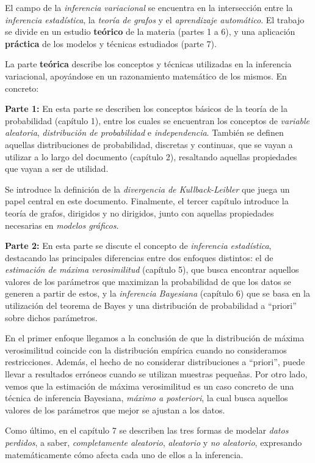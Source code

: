 
El campo de la \emph{inferencia variacional} se encuentra en la intersección entre la \emph{inferencia estadística}, la \emph{teoría de grafos} y el \emph{aprendizaje automático}. El trabajo se divide en un estudio \textbf{teórico} de la materia (partes 1 a 6), y una aplicación \textbf{práctica} de los modelos y técnicas estudiados (parte 7).

La parte \textbf{teórica} describe los conceptos y técnicas utilizadas en la inferencia variacional, apoyándose en un razonamiento matemático de los mismos. En concreto:

\textbf{Parte 1:} En esta parte se describen los conceptos básicos de la teoría de la probabilidad (capítulo 1), entre los cuales se encuentran los conceptos de \emph{variable aleatoria}, \emph{distribución de probabilidad} e \emph{independencia}. También se definen aquellas distribuciones de probabilidad, discretas y continuas, que se vayan a utilizar a lo largo del documento (capítulo 2), resaltando aquellas propiedades que vayan a ser de utilidad.

Se introduce la definición de la \emph{divergencia de Kullback-Leibler} que juega un papel central en este documento. Finalmente, el tercer capítulo introduce la teoría de grafos, dirigidos y no dirigidos, junto con aquellas propiedades necesarias en \emph{modelos gráficos}.

\textbf{Parte 2:} En esta parte se discute el concepto de \emph{inferencia estadística}, destacando las principales diferencias entre dos enfoques distintos: el de \emph{estimación de máxima verosimilitud} (capítulo 5), que busca encontrar aquellos valores de los parámetros que maximizan la probabilidad de que los datos se generen a partir de estos, y la \emph{inferencia Bayesiana} (capítulo 6) que se basa en la utilización del teorema de Bayes y una distribución de probabilidad a ``priori'' sobre dichos parámetros.

En el primer enfoque llegamos a la conclusión de que la distribución de máxima verosimilitud coincide con la distribución empírica cuando no consideramos restricciones. Además, el hecho de no considerar distribuciones a ``priori'', puede llevar a resultados erróneos cuando se utilizan muestras pequeñas. Por otro lado, vemos que la estimación de máxima verosimilitud es un caso concreto de una técnica de inferencia Bayesiana, \emph{máximo a posteriori}, la cual busca aquellos valores de los parámetros que mejor se ajustan a los datos.

Como último, en el capítulo 7 se describen las tres formas de modelar \emph{datos perdidos}, a saber, \emph{completamente aleatorio}, \emph{aleatorio} y \emph{no aleatorio}, expresando matemáticamente cómo afecta cada uno de ellos a la inferencia.


